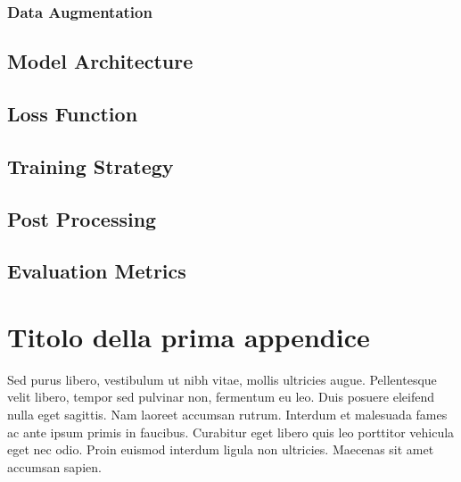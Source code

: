 \documentclass[target=bach,aauheader=,style=]{thud}
\begin{document}
\subsection{Data Augmentation}
\section{Model Architecture}
\section{Loss Function}
\section{Training Strategy}
\section{Post Processing}
\section{Evaluation Metrics}

\appendix


\chapter{Titolo della prima appendice}
Sed purus libero, vestibulum ut nibh vitae, mollis ultricies augue. Pellentesque velit libero, tempor sed pulvinar non, fermentum eu leo. Duis posuere eleifend nulla eget sagittis. Nam laoreet accumsan rutrum. Interdum et malesuada fames ac ante ipsum primis in faucibus. Curabitur eget libero quis leo porttitor vehicula eget nec odio. Proin euismod interdum ligula non ultricies. Maecenas sit amet accumsan sapien.

\backmatter

\end{document}
